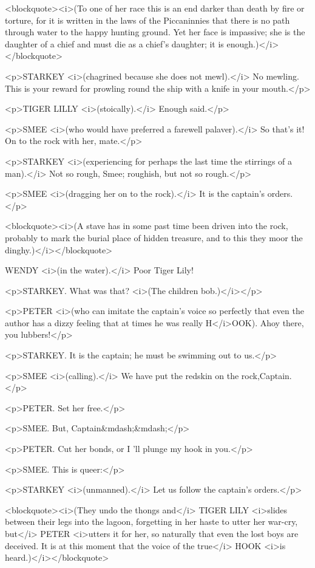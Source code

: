 <blockquote><i>(To one of her race this is an end darker than death
by fire or torture, for it is written in the laws of the Piccaninnies
that there is no path through water to the happy hunting ground. Yet
her face is impassive; she is the daughter of a chief and must die as
a chief's daughter; it is enough.)</i></blockquote>

<p>STARKEY <i>(chagrined because she does not mewl).</i> No mewling.
This is your reward for prowling round the ship with a knife in your
mouth.</p>

<p>TIGER LILLY <i>(stoically).</i> Enough said.</p>

<p>SMEE <i>(who would have preferred a farewell palaver).</i> So
that's it! On to the rock with her, mate.</p>

<p>STARKEY <i>(experiencing for perhaps the last time the stirrings
of a man).</i> Not so rough, Smee; roughish, but not so rough.</p>

<p>SMEE <i>(dragging her on to the rock).</i> It is the captain's
orders.</p>

<blockquote><i>(A stave has in some past time been driven into the
rock, probably to mark the burial place of hidden treasure, and to
this they moor the dinghy.)</i></blockquote>

WENDY <i>(in the water).</i> Poor Tiger Lily! 

<p>STARKEY. What was that? <i>(The children bob.)</i></p>

<p>PETER <i>(who can imitate the captain's voice so perfectly that
even the author has a dizzy feeling that at times he was really
H</i>OOK). Ahoy there, you lubbers!</p>

<p>STARKEY. It is the captain; he must be swimming out to us.</p>

<p>SMEE <i>(calling).</i> We have put the redskin on the
rock,Captain.</p>

<p>PETER. Set her free.</p>

<p>SMEE. But, Captain&mdash;&mdash;</p>

<p>PETER. Cut her bonds, or I 'll plunge my hook in you.</p>

<p>SMEE. This is queer:</p>

<p>STARKEY <i>(unmanned).</i> Let us follow the captain's orders.</p>

<blockquote><i>(They undo the thongs and</i> TIGER LILY <i>slides
between their legs into the lagoon, forgetting in her haste to utter
her war-cry, but</i> PETER <i>utters it for her, so naturally that
even the lost boys are deceived. It is at this moment that the voice
of the true</i> HOOK <i>is heard.)</i></blockquote>

